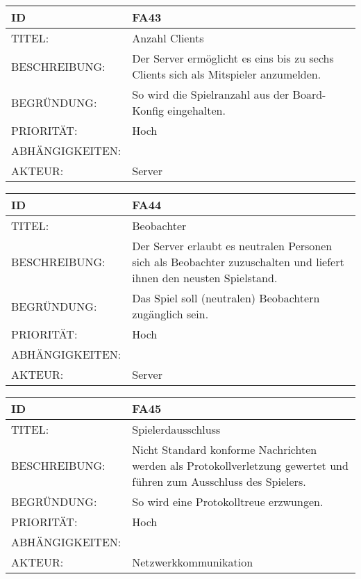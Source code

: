 \documentclass{uulm-assignment}
\begin{document}
    \begin{tabularx}{\textwidth}{|l|X |} \hline
        \textbf{ID} & \textbf{FA43} \\
        \hline
        TITEL: & Anzahl Clients \\
        \hline
        BESCHREIBUNG: &  Der Server ermöglicht es eins bis zu sechs Clients sich als Mitspieler anzumelden.\\
        \hline
        BEGRÜNDUNG: &  So wird die Spielranzahl aus der Board-Konfig eingehalten.\\
        \hline
        PRIORITÄT: & Hoch\\
        \hline
        ABHÄNGIGKEITEN: & \\
        \hline
        AKTEUR: & Server\\
        \hline
    \end{tabularx}
    
    \begin{tabularx}{\textwidth}{|l|X |} \hline
        \textbf{ID} & \textbf{FA44} \\
        \hline
        TITEL: &  Beobachter\\
        \hline
        BESCHREIBUNG: &  Der Server erlaubt es neutralen Personen sich als Beobachter zuzuschalten und liefert ihnen den neusten Spielstand.\\
        \hline
        BEGRÜNDUNG: &  Das Spiel soll (neutralen) Beobachtern zugänglich sein.\\
        \hline
        PRIORITÄT: & Hoch\\
        \hline
        ABHÄNGIGKEITEN: &  \\
        \hline
        AKTEUR: & Server\\
        \hline
    \end{tabularx}
    
     \begin{tabularx}{\textwidth}{|l|X |} \hline
        \textbf{ID} & \textbf{FA45} \\
        \hline
        TITEL: &  Spielerdausschluss\\
        \hline
        BESCHREIBUNG: &  Nicht Standard konforme Nachrichten werden als Protokollverletzung gewertet und führen zum Ausschluss des Spielers.\\
        \hline
        BEGRÜNDUNG: &  So wird eine Protokolltreue erzwungen.\\
        \hline
        PRIORITÄT: & Hoch\\
        \hline
        ABHÄNGIGKEITEN: &  \\
        \hline
        AKTEUR: & Netzwerkkommunikation\\
        \hline
    \end{tabularx}
    
\end{document}
